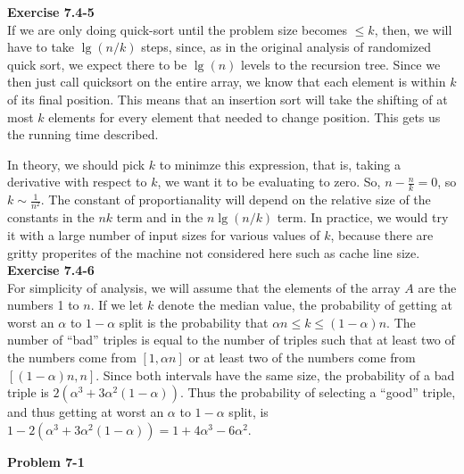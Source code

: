 \documentclass{article}
\begin{document}
\noindent\textbf{Exercise 7.4-5}\\

If we are only doing quick-sort until the problem size becomes $\le k$, then, we will have to take $\lg(n/k)$ steps, since, as in the original analysis of randomized quick sort, we expect there to be $\lg(n)$ levels to the recursion tree. Since we then just call quicksort on the entire array, we know that each element is within $k$ of its final position. This means that an insertion sort will take the shifting of at most $k$ elements for every element that needed to change position. This gets us the running time described.

In theory, we should pick $k$ to minimze this expression, that is, taking a derivative with respect to $k$, we want it to be evaluating to zero. So, $n - \frac{n}{k} =0$, so $k \sim \frac{1}{n^2} $. The constant of proportianality will depend on the relative size of the constants in the $nk$ term and in the $n\lg(n/k)$ term. In practice, we would try it with a large number of input sizes for various values of $k$, because there are gritty properites of the machine not considered here such as cache line size.
\\

\noindent\textbf{Exercise 7.4-6}\\

For simplicity of analysis, we will assume that the elements of the array $A$ are the numbers 1 to $n$.  If we let $k$ denote the median value, the probability of getting at worst an $\alpha$ to $1-\alpha$ split is the probability that $\alpha n \leq k \leq (1-\alpha)n$.  The number of ``bad'' triples is equal to the number of triples such that at least two of the numbers come from $[1,\alpha n]$ or at least two of the numbers come from $[(1-\alpha)n, n]$.  Since both intervals have the same size, the probability of a bad triple is $2(\alpha^3 +3\alpha^2(1-\alpha))$.  Thus the probability of selecting a ``good'' triple, and thus getting at worst an $\alpha$ to $1-\alpha$ split, is $1 - 2(\alpha^3 +3\alpha^2(1-\alpha)) = 1 + 4\alpha^3 - 6\alpha^2$.

\noindent\textbf{Problem 7-1}\\
\end{document}
